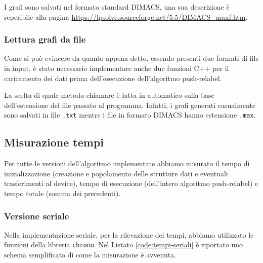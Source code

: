                 I grafi sono salvati nel formato standard DIMACS, una sua descrizione è reperibile alla pagina \url{https://lpsolve.sourceforge.net/5.5/DIMACS_maxf.htm}.


            \subsubsection*{Lettura grafi da file}

                Come si può evincere da quanto appena detto, essendo presenti due formati di file in input, è stato necessario implementare anche due funzioni C++ per il caricamento dei dati prima dell'esecuzione dell'algoritmo push-relabel.

                La scelta di quale metodo chiamare è fatta in automatico sulla base dell'estensione del file passato al programma. Infatti, i grafi generati casualmente sono salvati in file \verb|.txt| mentre i file in formato DIMACS hanno estensione \verb|.max|.

            
        \subsection{Misurazione tempi}

            Per tutte le versioni dell'algoritmo implementate abbiamo misurato il tempo di inizializzazione (creazione e popolamento delle strutture dati e eventuali trasferimenti al device), tempo di esecuzione (dell'intero algoritmo push-relabel) e tempo totale (somma dei precedenti).

            \subsubsection*{Versione seriale}
            
                Nella implementazione seriale, per la rilevazione dei tempi, abbiamo utilizzato le funzioni della libreria \verb|chrono|. Nel Listato \ref{code:tempi-seriali} è riportato uno schema semplificato di come la misurazione è avvenuta.

